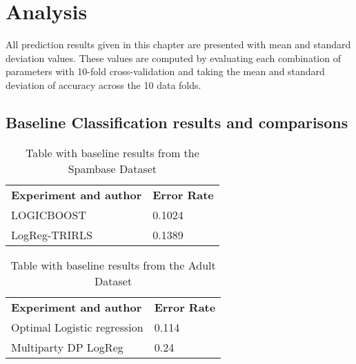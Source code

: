 
\chapter{Analysis}
\label{ch:analysis}
All prediction results given in this chapter are presented with mean and standard deviation values. These values are computed by evaluating each combination of parameters with 10-fold cross-validation and taking the mean and standard deviation of accuracy across the 10 data folds.


\section{Baseline Classification results and comparisons}
\begin{table}[h]
	\begin{tabularx}{\textwidth}{|X|l|}
		\textbf{Experiment and author}                                             & \textbf{Error Rate}      \\
		LOGICBOOST\citep{sharma2013adaptive}                                       & 0.1024 \\
		LogReg-TRIRLS\citep{kumar2012comparative}                                  & 0.1389 \\
	\end{tabularx}
	\caption{Table with baseline results from the Spambase Dataset}
	\label{tab:baseline_class_results_spambase}
\end{table}

\begin{table}[h]
\begin{tabularx}{\textwidth}{|X|l|}
	\textbf{Experiment and author}                                                 & \textbf{Error Rate}      \\
	Optimal Logistic regression \citep{caruana2006empirical}   				       & 0.114 \\
	Multiparty DP LogReg \citep{pathak2010diffprivhomo}                            & 0.24 \\	
\end{tabularx}
\caption{Table with baseline results from the Adult Dataset}
\label{tab:baseline_class_results_adult}
\end{table}

	

